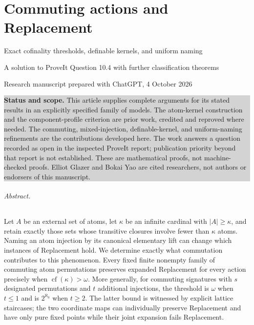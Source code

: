 \documentclass[11pt,letterpaper]{article}
\numberwithin{equation}{section}
\theoremstyle{plain}
\theoremstyle{definition}
\theoremstyle{remark}
\newcommand{\cf}{\operatorname{cf}}
\newcommand{\status}[1]{\par\noindent\colorbox{lightgray}{\parbox{\dimexpr\linewidth-2\fboxsep\relax}{#1}}\par}
\begin{document}
\clearpage
{}
\part{Commuting actions and Replacement}
\label{nee:ca:part}

\setcounter{section}{11}
\renewcommand{\thesection}{\arabic{section}}
\renewcommand{\theHsection}{ca.\arabic{section}}
\makeatletter\gdef\Hy@chapapp{\Hy@chapterstring}\makeatother

{\Large Exact cofinality thresholds, definable kernels, and uniform naming\par}
\smallskip
{\large A solution to ProveIt Question 10.4 with further classification theorems\par}
\smallskip
{Research manuscript prepared with ChatGPT, 4 October 2026\par}

\status{\textbf{Status and scope.} This article supplies complete arguments for its stated results in an explicitly specified family of models. The atom-kernel construction and the component-profile criterion are prior work, credited and reproved where needed. The commuting, mixed-injection, definable-kernel, and uniform-naming refinements are the contributions developed here. The work answers a question recorded as open in the inspected ProveIt report; publication priority beyond that report is not established. These are mathematical proofs, not machine-checked proofs. Elliot Glazer and Bokai Yao are cited researchers, not authors or endorsers of this manuscript.}

\paragraph{Abstract.}
Let $A$ be an external set of atoms, let $\kappa$ be an infinite cardinal with $|A|\geq\kappa$, and retain exactly those sets whose transitive closures involve fewer than $\kappa$ atoms. Naming an atom injection by its canonical elementary lift can change which instances of Replacement hold. We determine exactly what commutation contributes to this phenomenon. Every fixed finite nonempty family of commuting atom permutations preserves expanded Replacement for every action precisely when $\cf(\kappa)>\omega$. More generally, for commuting signatures with $s$ designated permutations and $t$ additional injections, the threshold is $\omega$ when $t\leq1$ and is $2^{\aleph_0}$ when $t\geq2$. The latter bound is witnessed by explicit lattice staircases; the two coordinate maps can individually preserve Replacement and have only pure fixed points while their joint expansion fails Replacement.
\end{document}
